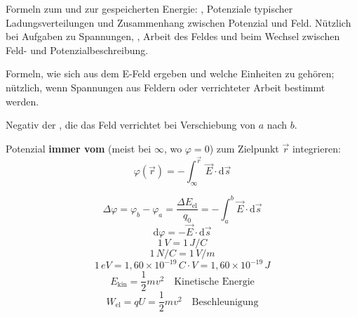 

\begin{runintext}
Formeln zum  und zur gespeicherten Energie: , Potenziale typischer Ladungsverteilungen und Zusammenhang zwischen Potenzial und Feld. Nützlich bei Aufgaben zu Spannungen, , Arbeit des Feldes und beim Wechsel zwischen Feld- und Potenzialbeschreibung.
\end{runintext}

\begin{runintext}
Formeln, wie sich  aus dem E-Feld ergeben und welche Einheiten zu  gehören; nützlich, wenn Spannungen aus Feldern oder verrichteter Arbeit bestimmt werden.
\end{runintext}
\begin{defbox}[Potenzialdifferenz]
Negativ der , die das Feld verrichtet bei Verschiebung von $a$ nach $b$.
\end{defbox}

\begin{warnbox}
Potenzial \textbf{immer vom } (meist bei $\infty$, wo $\varphi=0$) zum Zielpunkt $\vec{r}$ integrieren:
\[ \varphi(\vec{r}) = -\int_{\infty}^{\vec{r}} \vec{E}\cdot\mathrm{d}\vec{s} \]
\end{warnbox}

\begin{formulabox}
\[ \Delta\varphi = \varphi_b - \varphi_a = \frac{\Delta E_{\mathrm{el}}}{q_0} = -\int_a^b \vec{E}\cdot\mathrm{d}\vec{s} \]
\formulasep
\[ \mathrm{d}\varphi = -\vec{E}\cdot\mathrm{d}\vec{s} \]
\[ 1\,\si{V} = 1\,\si{J/C} \]
\[ 1\,\si{N/C} = 1\,\si{V/m} \]
\[ 1\,\si{eV} = 1{,}60\times 10^{-19}\,\si{C\cdot V} = 1{,}60\times 10^{-19}\,\si{J} \]
\formulasep
\[ E_{\mathrm{kin}} = \frac{1}{2}mv^2 \quad \text{Kinetische Energie} \]
\[ W_{\mathrm{el}} = qU = \frac{1}{2}mv^2 \quad \text{Beschleunigung} \]
\end{formulabox}

